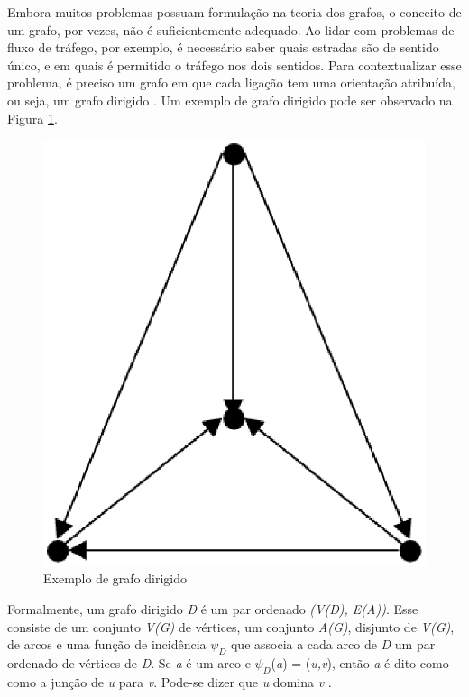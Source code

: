 Embora muitos problemas possuam formulação na teoria dos grafos, o conceito de um grafo, por vezes, não é suficientemente adequado. Ao lidar com problemas de fluxo de tráfego, por exemplo, é necessário saber quais estradas são de sentido único, e em quais é permitido o tráfego nos dois sentidos. Para contextualizar esse problema, é preciso um grafo em que cada ligação tem uma orientação atribuída, ou seja, um grafo dirigido \cite{Bondy:2007}. Um exemplo de grafo dirigido pode ser observado na Figura \ref{dirigido}.

\begin{figure}[!h]
	\centering
	\includegraphics[scale=0.15]{figuras/capitulo2/dirigido.eps}
	\caption{Exemplo de grafo dirigido}
	\label{dirigido}
\end{figure}

Formalmente, um grafo dirigido \textit{D} é um par ordenado \textit{(V(D), E(A))}. Esse consiste de um conjunto \textit{V(G)} de vértices, um conjunto \textit{A(G)}, disjunto de \textit{V(G)}, de arcos e uma função de incidência $\psi_D$ que associa a cada arco de \textit{D} um par ordenado de vértices de \textit{D}. Se \textit{a} é um arco e $\psi_D$(\textit{a}) = (\textit{u,v}), então \textit{a} é dito como como a junção de \textit{u} para \textit{v}. Pode-se dizer que \textit{u} domina \textit{v} \cite{Diestel:1997}.

